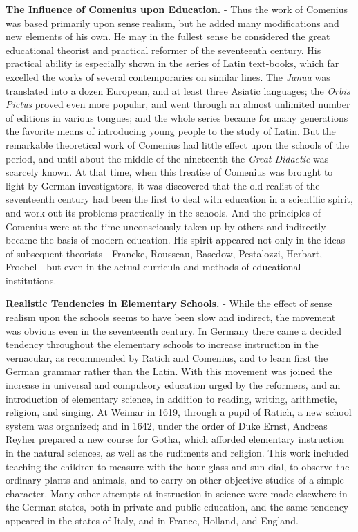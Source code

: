 \documentclass[]{book}
\begin{document}
\textbf{The Influence of Comenius upon Education.} - Thus the work of Comenius was based primarily upon sense realism, but he added many modifications and new elements of his own. He may in the fullest sense be considered the great educational theorist and practical reformer of the seventeenth century. His practical ability is especially shown in the series of Latin text-books, which far excelled the works of several contemporaries on similar lines. The \emph{Janua} was translated into a dozen European, and at least three Asiatic languages; the \emph{Orbis Pictus} proved even more popular, and went through an almost unlimited number of editions in various tongues; and the whole series became for many generations the favorite means of introducing young people to the study of Latin. But the remarkable theoretical work of Comenius had little effect upon the schools of the period, and until about the middle of the nineteenth the \emph{Great Didactic} was scarcely known. At that time, when this treatise of Comenius was brought to light by German investigators, it was discovered that the old realist of the seventeenth century had been the first to deal with education in a scientific spirit, and work out its problems practically in the schools. And the principles of Comenius were at the time unconsciously taken up by others and indirectly became the basis of modern education. His spirit appeared not only in the ideas of subsequent theorists - Francke, Rousseau, Basedow, Pestalozzi, Herbart, Froebel - but even in the actual curricula and methods of educational institutions.

\textbf{Realistic Tendencies in Elementary Schools.} - While the effect of sense realism upon the schools seems to have been slow and indirect, the movement was obvious even in the seventeenth century. In Germany there came a decided tendency throughout the elementary schools to increase instruction in the vernacular, as recommended by Ratich and Comenius, and to learn first the German grammar rather than the Latin. With this movement was joined the increase in universal and compulsory education urged by the reformers, and an introduction of elementary science, in addition to reading, writing, arithmetic, religion, and singing. At Weimar in 1619, through a pupil of Ratich, a new school system was organized; and in 1642, under the order of Duke Ernst, Andreas Reyher prepared a new course for Gotha, which afforded elementary instruction in the natural sciences, as well as the rudiments and religion. This work included teaching the children to measure with the hour-glass and sun-dial, to observe the ordinary plants and animals, and to carry on other objective studies of a simple character. Many other attempts at instruction in science were made elsewhere in the German states, both in private and public education, and the same tendency appeared in the states of Italy, and in France, Holland, and England.
\end{document}
